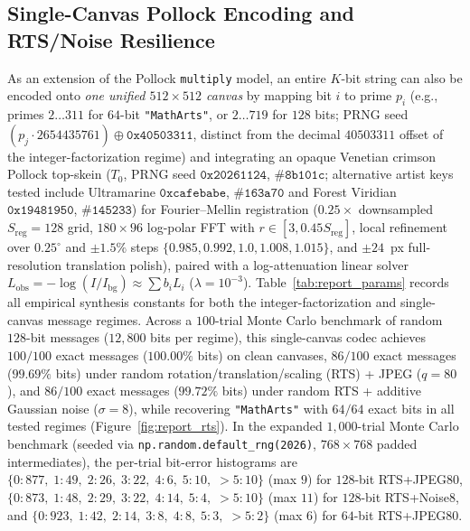 \documentclass[]{interact}
\theoremstyle{plain}
\theoremstyle{definition}
\theoremstyle{remark}
\begin{document}
\subsection{Single-Canvas Pollock Encoding and RTS/Noise Resilience}
As an extension of the Pollock \texttt{multiply} model, an entire $K$-bit string can also be encoded onto \emph{one unified $512 \times 512$ canvas} by mapping bit $i$ to prime $p_i$ (e.g., primes $2 \dots 311$ for $64$-bit \texttt{"MathArts"}, or $2 \dots 719$ for $128$ bits; PRNG seed $(p_j \cdot 2654435761) \oplus \texttt{0x40503311}$, distinct from the decimal $40503311$ offset of the integer-factorization regime) and integrating an opaque Venetian crimson Pollock top-skein ($T_0$, PRNG seed $\texttt{0x20261124}$, $\#\texttt{8b101c}$; alternative artist keys tested include Ultramarine $\texttt{0xcafebabe}$, $\#\texttt{163a70}$ and Forest Viridian $\texttt{0x19481950}$, $\#\texttt{145233}$) for Fourier--Mellin registration ($0.25\times$ downsampled $S_{\mathrm{reg}} = 128$ grid, $180 \times 96$ log-polar FFT with $r \in [3, 0.45 S_{\mathrm{reg}}]$, local refinement over $0.25^\circ$ and $\pm 1.5\%$ steps $\{0.985, 0.992, 1.0, 1.008, 1.015\}$, and $\pm 24$~px full-resolution translation polish), paired with a log-attenuation linear solver $L_{\mathrm{obs}} = -\log(I/I_{\mathrm{bg}}) \approx \sum b_i L_i$ ($\lambda = 10^{-3}$). Table~\ref{tab:report_params} records all empirical synthesis constants for both the integer-factorization and single-canvas message regimes. Across a $100$-trial Monte Carlo benchmark of random $128$-bit messages ($12{,}800$ bits per regime), this single-canvas codec achieves $100/100$ exact messages ($100.00\%$ bits) on clean canvases, $86/100$ exact messages ($99.69\%$ bits) under random rotation/translation/scaling (RTS) + JPEG ($q=80$), and $86/100$ exact messages ($99.72\%$ bits) under random RTS + additive Gaussian noise ($\sigma=8$), while recovering \texttt{"MathArts"} with $64/64$ exact bits in all tested regimes (Figure~\ref{fig:report_rts}). In the expanded $1{,}000$-trial Monte Carlo benchmark (seeded via \texttt{np.random.default\_rng(2026)}, $768 \times 768$ padded intermediates), the per-trial bit-error histograms are $\{0: 877,\; 1: 49,\; 2: 26,\; 3: 22,\; 4: 6,\; 5: 10,\; {>}5: 10\}$ (max $9$) for $128$-bit RTS+JPEG80, $\{0: 873,\; 1: 48,\; 2: 29,\; 3: 22,\; 4: 14,\; 5: 4,\; {>}5: 10\}$ (max $11$) for $128$-bit RTS+Noise8, and $\{0: 923,\; 1: 42,\; 2: 14,\; 3: 8,\; 4: 8,\; 5: 3,\; {>}5: 2\}$ (max $6$) for $64$-bit RTS+JPEG80.
\end{document}
